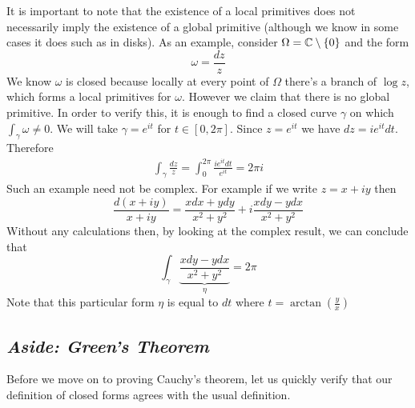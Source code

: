It is important to note that the existence of a local primitives does not necessarily imply the existence of a global primitive (although we know in some cases it does such as in disks). As an example, consider $\Omega = \mathbb{C} \setminus \{0\}$ and the form
$$ \omega = \frac{dz}{z}$$
We know $\omega$ is closed because locally at every point of $\Omega$ there's a branch of $\log z$, which forms a local primitives for $\omega$. However we claim that there is no global primitive. In order to verify this, it is enough to find a closed curve $\gamma$ on which $\int_\gamma \omega \neq 0$. We will take $\gamma = e^{it}$ for $t \in [0, 2\pi]$. Since $z = e^{it}$ we have $dz = ie^{it} dt$. Therefore
\begin{align*}
    \int_{\gamma} \frac{dz}{z} = \int_{0}^{2\pi} \frac{ie^{it} dt}{e^{it }} = 2\pi i 
\end{align*}
Such an example need not be complex. For example if we write $z = x + iy$ then
$$ \frac{d(x + iy)}{x + iy} = \frac{xdx + ydy}{x^2 + y^2} + i \frac{xdy - ydx}{x^2 + y^2} $$
Without any calculations then, by looking at the complex result, we can conclude that
$$ \int_{\gamma} \underbrace{\frac{xdy - ydx}{x^2 + y^2}}_{\eta} = 2\pi $$
Note that this particular form $\eta$ is equal to $dt$ where $t = \arctan(\frac{y}{x})$

\subsection{\textit{Aside: Green's Theorem}}
Before we move on to proving Cauchy's theorem, let us quickly verify that our definition of closed forms agrees with the usual definition.

